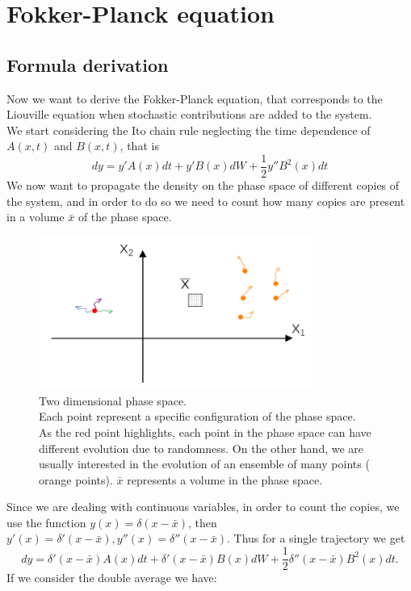 \section{Fokker-Planck equation}
\subsection{Formula derivation}
Now we want to derive the Fokker-Planck equation, that corresponds to the Liouville equation when stochastic contributions are added to the system.\\
We start considering the Ito chain rule neglecting the time dependence of $A(x,t)$ and $B(x,t)$, that is 
\[
dy=y'A(x)dt+y'B(x)dW+\frac{1}{2}y''B^2(x)dt
\]
We now want to propagate the density on the phase space of different copies of the system, and in order to do so we need to count how many copies are present in a volume $\bar{x}$ of the phase space.

\begin{figure}[H]
  \centering
  \includegraphics[width=0.8\textwidth]{SDE/Figures/Phase_space_Fokker.png}
  \caption{Two dimensional phase space.\\\hspace{\textwidth}
  Each point represent a specific configuration of the phase space. \\\hspace{\textwidth}
  As the {\color{red} red point} highlights, each point in the phase space can have different evolution due to randomness. On the other hand, we are usually interested in the evolution of an ensemble of many points ({\color{orange} orange points}). $\bar{x}$ represents a volume in the phase space.
  } 
  \label{Fig:Fokker_phase_space}
\end{figure}

Since we are dealing with continuous variables, in order to count the copies, we use the function $y(x)= \delta(x-\bar{x})$, then $y'(x)=\delta'(x-\bar{x}), y''(x)=\delta''(x-\bar{x})$.
Thus for a single trajectory we get
\begin{equation}
dy=\delta'(x-\bar{x})A(x)dt+\delta'(x-\bar{x})B(x)dW+\frac{1}{2}\delta''(x-\bar{x})B^2(x)dt.
\end{equation}
If we consider the double average we have:

